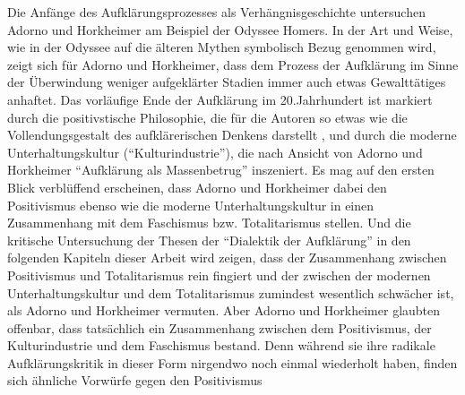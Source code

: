 \documentclass[12pt,a4paper,ngerman]{article}
\begin{document}
Die Anfänge des Aufklärungsprozesses als Verhängnisgeschichte
untersuchen Adorno und Horkheimer am Beispiel der Odyssee Homers. In
der Art und Weise, wie in der Odyssee auf die älteren Mythen
symbolisch Bezug genommen wird, zeigt sich für Adorno und Horkheimer,
dass dem Prozess der Aufklärung im Sinne der Überwindung weniger
aufgeklärter Stadien immer auch etwas Gewalttätiges anhaftet. Das
vorläufige Ende der Aufklärung im 20.Jahrhundert ist markiert durch
die positivstische Philosophie, die für die Autoren so etwas wie die
Vollendungsgestalt des aufklärerischen Denkens darstellt \cite[S. 22,
S. 24]{adorno-horkheimer:1947}, und durch die moderne
Unterhaltungskultur ("`Kulturindustrie"'), die nach Ansicht von Adorno
und Horkheimer "`Aufklärung als Massenbetrug"' \cite[S.
128]{adorno-horkheimer:1947} inszeniert. Es mag auf den ersten Blick
verblüffend erscheinen, dass Adorno und Horkheimer dabei den
Positivismus ebenso wie die moderne Unterhaltungskultur in einen
Zusammenhang mit dem Faschismus bzw. Totalitarismus stellen. Und die
kritische Untersuchung der Thesen der "`Dialektik der Aufklärung"' in
den folgenden Kapiteln dieser Arbeit wird zeigen, dass der
Zusammenhang zwischen Positivismus und Totalitarismus rein fingiert
und der zwischen der modernen Unterhaltungskultur und dem
Totalitarismus zumindest wesentlich schwächer ist, als Adorno und
Horkheimer vermuten. Aber Adorno und Horkheimer glaubten offenbar,
dass tatsächlich ein Zusammenhang zwischen dem Positivismus, der
Kulturindustrie und dem Faschismus bestand. Denn während sie ihre
radikale Aufklärungskritik in dieser Form nirgendwo noch einmal
wiederholt haben, finden sich ähnliche Vorwürfe gegen den Positivismus
\end{document}
